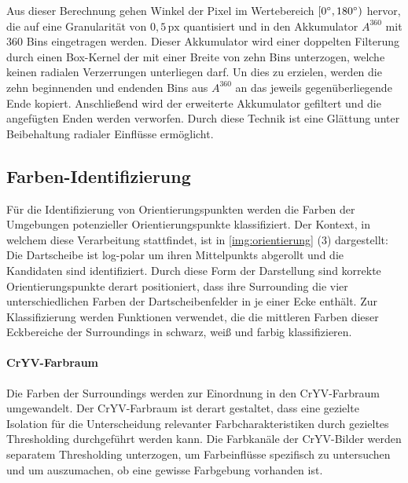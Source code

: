 Aus dieser Berechnung gehen Winkel der Pixel im Wertebereich $[0^{\circ}, 180^{\circ})$ hervor, die auf eine Granularität von $0,\!5\,\text{px}$ quantisiert und in den Akkumulator $A^{360}$ mit $360$ Bins eingetragen werden. Dieser Akkumulator wird einer doppelten Filterung durch einen Box-Kernel der mit einer Breite von zehn Bins unterzogen, welche keinen radialen Verzerrungen unterliegen darf. Un dies zu erzielen, werden die zehn beginnenden und endenden Bins aus $A^{360}$ an das jeweils gegenüberliegende Ende kopiert. Anschließend wird der erweiterte Akkumulator gefiltert und die angefügten Enden werden verworfen. Durch diese Technik ist eine Glättung unter Beibehaltung radialer Einflüsse ermöglicht.



\vspace*{-0.1cm}
\subsection{Farben-Identifizierung}
\label{sec:farbidentifizierung_impl}

Für die Identifizierung von Orientierungspunkten werden die Farben der Umgebungen potenzieller Orientierungspunkte klassifiziert. Der Kontext, in welchem diese Verarbeitung stattfindet, ist in \autoref{img:orientierung} (3) dargestellt: Die Dartscheibe ist log-polar um ihren Mittelpunkts abgerollt und die Kandidaten sind identifiziert. Durch diese Form der Darstellung sind korrekte Orientierungspunkte derart positioniert, dass ihre Surrounding die vier unterschiedlichen Farben der Dartscheibenfelder in je einer Ecke enthält. Zur Klassifizierung werden Funktionen verwendet, die die mittleren Farben dieser Eckbereiche der Surroundings in schwarz, weiß und farbig klassifizieren.

\vspace*{-0.1cm}
\paragraph{CrYV-Farbraum}

Die Farben der Surroundings werden zur Einordnung in den CrYV-Farbraum umgewandelt. Der CrYV-Farbraum ist derart gestaltet, dass eine gezielte Isolation für die Unterscheidung relevanter Farbcharakteristiken durch gezieltes Thresholding durchgeführt werden kann. Die Farbkanäle der CrYV-Bilder werden separatem Thresholding unterzogen, um Farbeinflüsse spezifisch zu untersuchen und um auszumachen, ob eine gewisse Farbgebung vorhanden ist.

